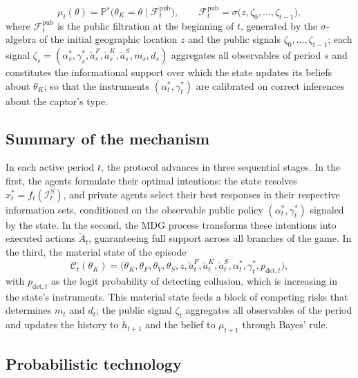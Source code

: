 \documentclass[review,authoryear,12pt]{elsarticle}
\theoremstyle{plain}
\theoremstyle{definition}
\newcommand{\Prob}{\mathbb{P}}
\newcommand{\1}{\mathbf{1}}
\begin{document}
\[
\mu_t(\theta)=\Prob^s\!\bigl(\theta_K=\theta\mid\mathcal{F}_t^{\mathrm{pub}}\bigr),\qquad \mathcal{F}_t^{\mathrm{pub}}=\sigma\bigl(z,\zeta_0,\ldots,\zeta_{t-1}\bigr),
\]
where $\mathcal{F}_t^{\mathrm{pub}}$ is the public filtration at the beginning of $t$, generated by the $\sigma$-algebra of the initial geographic location $z$ and the public signals $\zeta_0,\ldots,\zeta_{t-1}$; each signal $\zeta_s=(\alpha_s^\ast,\gamma_s^\ast,\tilde{a}_s^F,\tilde{a}_s^K,\tilde{a}_s^S,m_s,d_s)$ aggregates all observables of period $s$ and constitutes the informational support over which the state updates its beliefs about $\theta_K$; so that the instruments $(\alpha_t^\ast,\gamma_t^\ast)$ are calibrated on correct inferences about the captor's type.

\subsection{Summary of the mechanism}\label{subsec:resumen-mecanismo}

In each active period $t$, the protocol advances in three sequential stages. In the first, the agents formulate their optimal intentions: the state resolves $x_t^\ast=f_t(\mathcal{I}_t^S)$, and private agents select their best responses in their respective information sets, conditioned on the observable public policy $(\alpha_t^\ast,\gamma_t^\ast)$ signaled by the state. In the second, the MDG process transforms these intentions into executed actions $\tilde{A}_t$, guaranteeing full support across all branches of the game. In the third, the material state of the episode
\[
\mathcal{C}_t(\theta_K)=\bigl(\theta_K,\theta_F,\theta_V,\theta_S,z,\tilde{a}_t^F,\tilde{a}_t^K,\tilde{a}_t^S,\alpha_t^\ast,\gamma_t^\ast,p_{\mathrm{det},t}\bigr),
\]
with $p_{\mathrm{det},t}$ as the logit probability of detecting collusion, which is increasing in the state's instruments. This material state feeds a block of competing risks that determines $m_t$ and $d_t$; the public signal $\zeta_t$ aggregates all observables of the period and updates the history to $h_{t+1}$ and the belief to $\mu_{t+1}$ through Bayes' rule.

\subsection{Probabilistic technology}\label{subsec:prob-tech}
\end{document}
